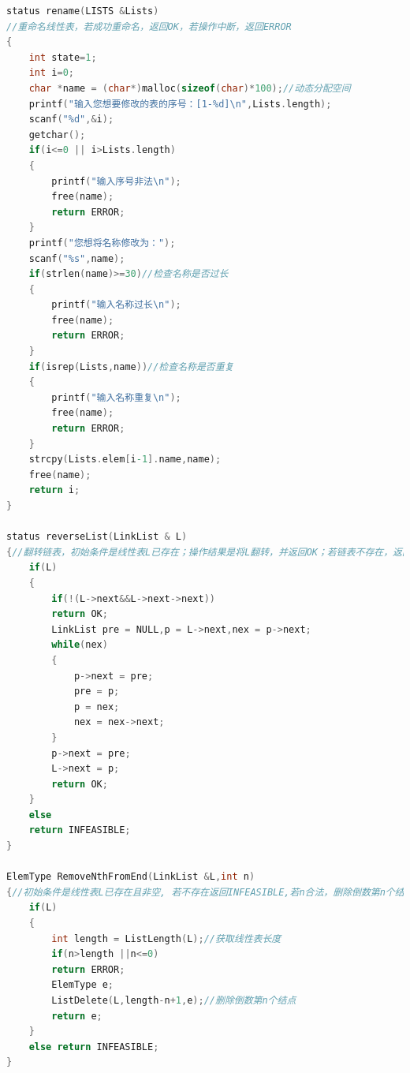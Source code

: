 \documentclass[supercite]{Experimental_Report}
\theoremstyle{definition}
\begin{document}
\begin{lstlisting}[language=C]
status rename(LISTS &Lists)
//重命名线性表，若成功重命名，返回OK，若操作中断，返回ERROR 
{
	int state=1;
	int i=0;
	char *name = (char*)malloc(sizeof(char)*100);//动态分配空间 
	printf("输入您想要修改的表的序号：[1-%d]\n",Lists.length);
	scanf("%d",&i);
	getchar();
	if(i<=0 || i>Lists.length)
	{
		printf("输入序号非法\n");
		free(name);
		return ERROR;
	}
	printf("您想将名称修改为：");
	scanf("%s",name);
	if(strlen(name)>=30)//检查名称是否过长 
	{
		printf("输入名称过长\n");
		free(name);
		return ERROR;
	}
	if(isrep(Lists,name))//检查名称是否重复 
	{
		printf("输入名称重复\n");
		free(name);
		return ERROR; 
	}
	strcpy(Lists.elem[i-1].name,name);
	free(name);
	return i;			
}

status reverseList(LinkList & L)
{//翻转链表，初始条件是线性表L已存在；操作结果是将L翻转，并返回OK；若链表不存在，返回INFEASIBLE； 
	if(L)
	{
		if(!(L->next&&L->next->next))
		return OK; 
		LinkList pre = NULL,p = L->next,nex = p->next;
		while(nex)
		{
			p->next = pre;
			pre = p;
			p = nex;
			nex = nex->next;
		}
		p->next = pre;
		L->next = p;
		return OK;
	}
	else
	return INFEASIBLE;
}

ElemType RemoveNthFromEnd(LinkList &L,int n)
{//初始条件是线性表L已存在且非空, 若不存在返回INFEASIBLE,若n合法，删除倒数第n个结点并返回结点的值，若不合法返回ERROR, 
	if(L)
	{
		int length = ListLength(L);//获取线性表长度 
		if(n>length ||n<=0)
		return ERROR;
		ElemType e;
		ListDelete(L,length-n+1,e);//删除倒数第n个结点 
		return e;
	}
	else return INFEASIBLE;
}


\end{lstlisting}
\end{document}

